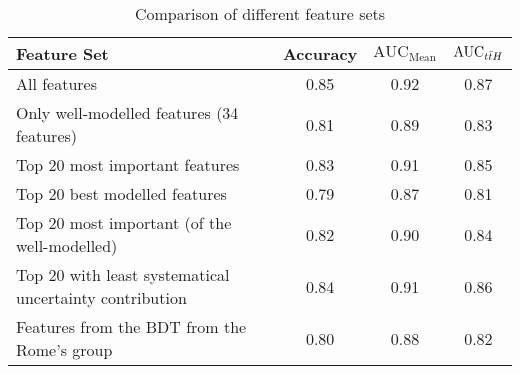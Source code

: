 \begin{table}[htbp]
    \centering
    \begin{tabular}{lccc}
        \toprule
        Feature Set                                             & Accuracy & $\text{AUC}_\text{Mean}$ & $\text{AUC}_{t\bar{t}H}$ \\
        \midrule
        All features                                            & 0.85     & 0.92                     & 0.87              \\
        Only well-modelled features      (34 features)          & 0.81     & 0.89                     & 0.83              \\
        Top 20 most important features                          & 0.83     & 0.91                     & 0.85              \\
        Top 20 best modelled features                           & 0.79     & 0.87                     & 0.81              \\
        Top 20 most important (of the well-modelled)            & 0.82     & 0.90                     & 0.84              \\
        Top 20 with least systematical uncertainty contribution & 0.84     & 0.91                     & 0.86              \\
        Features from the BDT from the Rome's group             & 0.80     & 0.88                     & 0.82              \\
        \bottomrule
    \end{tabular}
    \caption{Comparison of different feature sets}
    \label{tab:feature_sets}
\end{table}